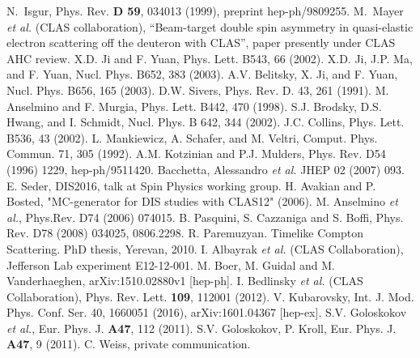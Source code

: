 \documentclass[a4paper,12pt]{report}
\begin{document}
\begin{thebibliography}{99}
  N.~Isgur,
  Phys. Rev. {\bf D 59}, 034013 (1999), 
 preprint hep-ph/9809255.
 M.~Mayer {\it et al.} (CLAS collaboration), ``Beam-target double spin asymmetry in quasi-elastic electron scattering off the deuteron with CLAS'',  paper presently under CLAS AHC review.
 X.D. Ji and F. Yuan, Phys. Lett. B543, 66 (2002).
 X.D. Ji, J.P. Ma, and F. Yuan, Nucl. Phys. B652, 383  (2003). 
 A.V. Belitsky, X. Ji, and F. Yuan, Nucl. Phys. B656, 165 (2003).
 D.W. Sivers, Phys. Rev. D. 43, 261 (1991). 
 M. Anselmino and F. Murgia, Phys. Lett. B442, 470 (1998). 
 S.J. Brodsky, D.S. Hwang, and I. Schmidt, Nucl. Phys. B 642, 344 (2002). 
 J.C. Collins, Phys. Lett. B536, 43 (2002). 
 L. Mankiewicz, A. Schafer, and M. Veltri,
 Comput. Phys. Commun. 71, 305 (1992).
 A.M. Kotzinian and P.J. Mulders, Phys. Rev. D54 (1996) 1229, hep-ph/9511420.
Bacchetta, Alessandro \textit{et al.} JHEP 02 (2007) 093.
E. Seder, DIS2016, talk at Spin Physics working group.
 H. Avakian and P. Bosted, "MC-generator for DIS studies with CLAS12" (2006).
M. Anselmino \textit{et al.}, Phys.Rev. D74 (2006) 074015. 
B. Pasquini, S. Cazzaniga and S. Boffi, Phys. Rev. D78 (2008) 034025, 0806.2298.
 R. Paremuzyan. Timelike Compton Scattering. PhD thesis, Yerevan, 2010.
 I. Albayrak {\it et al.} (CLAS Collaboration), Jefferson Lab experiment E12-12-001. 
 M. Boer, M. Guidal and M. Vanderhaeghen, arXiv:1510.02880v1 [hep-ph]. 
 I. Bedlinsky {\it et al.} (CLAS Collaboration), Phys. Rev. Lett. {\bf 109}, 112001 (2012). 
 V. Kubarovsky, Int. J. Mod. Phys. Conf. Ser. 40, 1660051 (2016), arXiv:1601.04367 [hep-ex]. 
 S.V. Goloskokov {\it et al.}, Eur. Phys. J. {\bf A47}, 112 (2011). 
 S.V. Goloskokov, P. Kroll, Eur. Phys. J. {\bf A47}, 9 (2011).  
 C. Weiss, private communication.
\end{thebibliography}

%
\end{document}
